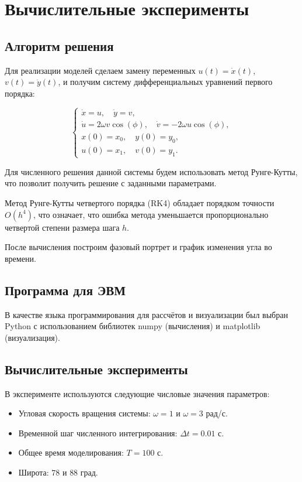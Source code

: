 \chapter{Вычислительные эксперименты}
\section{Алгоритм решения}

Для реализации моделей сделаем замену переменных \( u(t) = \dot{x}(t) \), \( v(t) = \dot{y}(t) \), и получим систему дифференциальных уравнений первого порядка:

\[
\begin{cases}
	\dot{x} = u, \quad \dot{y} = v, \\
	\dot{u} = 2\omega v\cos(\phi), \quad \dot{v} = -2\omega u\cos(\phi), \\
	x(0) = x_0, \quad y(0) = y_0, \\
	u(0) = x_1, \quad v(0) = y_1.
\end{cases}
\]

Для численного решения данной системы будем использовать метод Рунге-Кутты\cite{1964calculus}, что позволит получить решение с заданными параметрами. 

Метод Рунге-Кутты четвертого порядка (RK4) обладает порядком точности \( O(h^4) \), что означает, что ошибка метода уменьшается пропорционально четвертой степени размера шага \( h \). 


После вычисления построим фазовый портрет и график изменения угла во времени.

\section{Программа для ЭВМ}
В качестве языка программирования для рассчётов и визуализации был выбран Python с использованием библиотек numpy (вычисления) и matplotlib (визуализация).

 

\section{Вычислительные эксперименты}
В эксперименте используются следующие числовые значения параметров:

\begin{itemize}
	\item Угловая скорость вращения системы: \( \omega = 1\) и \( \omega = 3\) рад/с.
	\item Временной шаг численного интегрирования: \( \Delta t = 0.01 \) с.
	\item Общее время моделирования: \( T = 100 \) с.
	\item Широта: $78$ и $88$  град.
\end{itemize}

